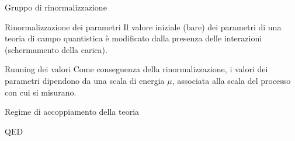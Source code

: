 \documentclass[]{beamer}
\begin{document}
\begin{frame}{Gruppo di rinormalizzazione}
	\begin{block}{Rinormalizzazione dei parametri}
	Il valore iniziale (bare) dei parametri di una teoria di campo quantistica è modificato dalla presenza delle interazioni (schermamento della carica). 
	\end{block}

	\begin{block}{Running dei valori}
	Come conseguenza della rinormalizzazione, i valori dei parametri dipendono da una scala di energia $\mu$, associata alla scala del processo con cui si misurano. 
	\end{block}
\end{frame}

\begin{frame}{Regime di accoppiamento della teoria}
	\begin{block}{}
	
	\end{block}

\end{frame}


\begin{frame}
	\begin{block}{QED}


	\end{block}
\end{frame}
\end{document}
